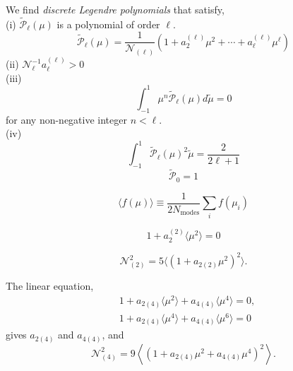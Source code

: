 \documentclass[a4paper,11pt, fleqn]{article}
\begin{document}
We find \textit{discrete Legendre polynomials} that satisfy,\\
%
(i) $\tilde{\mathcal{P}}_\ell(\mu)$ is a polynomial of order $\ell$.
\begin{equation}
  \tilde{\mathcal{P}}_\ell(\mu) = \frac{1}{\mathcal{N}_{(\ell)}} \left(1 + a_2^{(\ell)} \mu^2 + \cdots
  + a_\ell^{(\ell)} \mu^\ell \right)
\end{equation}
(ii) $\mathcal{N}_\ell^{-1} a_\ell^{(\ell)} > 0$\\
(iii) 
%
\begin{equation}
  \int_{-1}^1 \mu^n \tilde{\mathcal{P}}_\ell(\mu) d\tilde{\mu} = 0
\end{equation}
%
for any non-negative integer $n < \ell$.\\
(iv)
\begin{equation}
  \int_{-1}^1 \tilde{\mathcal{P}}_\ell(\mu)^2 \tilde{\mu} = \frac{2}{2\ell + 1}
\end{equation}
%
\begin{equation}
  \tilde{\mathcal{P}}_0 = 1
\end{equation}

\begin{equation}
  \langle f(\mu) \rangle \equiv \frac{1}{2N_\mathrm{modes}}\sum_i f(\mu_i)
\end{equation}

\begin{equation}
  1 + a_2^{(2)} \langle \mu^2 \rangle = 0
\end{equation}

\begin{equation}
  \mathcal{N}_{(2)}^2 = 5 \langle ( 1 + a_{2(2)} \mu^2)^2 \rangle.
\end{equation}

The linear equation,
\begin{align}
  &1 + a_{2(4)} \langle \mu^2 \rangle + a_{4(4)} \langle \mu^4\rangle = 0,\\
  &1 + a_{2(4)} \langle \mu^4 \rangle + a_{4(4)} \langle \mu^6 \rangle = 0
\end{align}
gives $a_{2(4)}$ and $a_{4(4)}$, and
\begin{equation}
  \mathcal{N}_{(4)}^2 = 9 \left\langle (1 + a_{2(4)}\mu^2 + a_{4(4)}\mu^4)^2 \right\rangle.
\end{equation}
  

\clearpage
%
%
\appendix

\sectionfont{\sffamily\Huge\color{Blue}\selectfont}
\subsectionfont{\sffamily\color{Blue}\selectfont}
\subsubsectionfont{\sffamily\color{Blue}\selectfont}
\paragraphfont{\sffamily\color{Blue}\selectfont}
\end{document}
